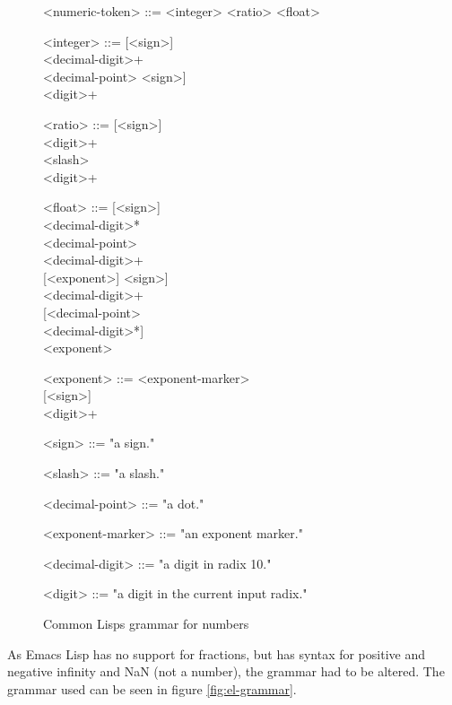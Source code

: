\documentclass[a4paper,10pt,twoside]{report}
\newcommand{\el}{Emacs Lisp}
\newcommand{\cl}{Common Lisp}
\begin{document}
\begin{figure}
  \begin{grammar}
    <numeric-token> ::= <integer> \alt <ratio> \alt <float>
  
    <integer> ::= {[}<sign>{]} \\
    <decimal-digit>+ \\
    <decimal-point>
    \alt {[}<sign>{]} \\
    <digit>+

    <ratio> ::= {[}<sign>{]} \\
    <digit>+ \\
    <slash> \\
    <digit>+
  
    <float> ::= {[}<sign>{]} \\
    <decimal-digit>* \\
    <decimal-point> \\
    <decimal-digit>+ \\
    {[}<exponent>{]}
    \alt {[}<sign>{]} \\
    <decimal-digit>+ \\
    {[}<decimal-point> \\
    <decimal-digit>*{]} \\
    <exponent>
  
    <exponent> ::= <exponent-marker> \\
    {[}<sign>{]} \\
    <digit>+
                                       
    <sign> ::= "a sign."
  
    <slash> ::= "a slash."
  
    <decimal-point> ::= "a dot."
  
    <exponent-marker> ::= "an exponent marker."
  
    <decimal-digit> ::= "a digit in radix 10."
  
    <digit> ::= "a digit in the current input radix."
  \end{grammar}
  
  \caption{\cl{}s grammar for numbers}
  \label{fig:cl-grammar}
\end{figure}
As \el{} has no support for fractions, but has syntax for positive and negative
infinity and NaN (not a number), the grammar had to be altered.  The grammar
used can be seen in figure \ref{fig:el-grammar}.
\end{document}
